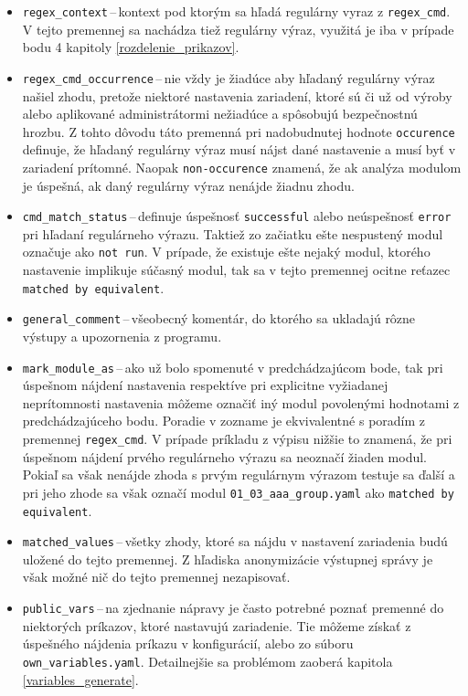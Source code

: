 \begin{itemize}
	\item \texttt{regex\_context}\,--\,kontext pod ktorým sa hľadá regulárny vyraz z \texttt{regex\_cmd}. V tejto premennej sa nachádza tiež regulárny výraz, využitá je iba v prípade bodu 4 kapitoly \ref{rozdelenie_prikazov}.
	\item \texttt{regex\_cmd\_occurrence}\,--\,nie vždy je žiadúce aby hľadaný regulárny výraz našiel zhodu, pretože niektoré nastavenia zariadení, ktoré sú či už od výroby alebo aplikované administrátormi nežiadúce a spôsobujú bezpečnostnú hrozbu. Z tohto dôvodu táto premenná pri nadobudnutej hodnote \texttt{occurence} definuje, že hľadaný regulárny výraz musí nájst dané nastavenie a musí byť v zariadení prítomné. Naopak \texttt{non-occurence} znamená, že ak analýza modulom je úspešná, ak daný regulárny výraz nenájde žiadnu zhodu. 
	\item \texttt{cmd\_match\_status}\,--\,definuje úspešnosť \texttt{successful} alebo neúspešnosť \texttt{error} pri hľadaní regulárneho výrazu. Taktiež zo začiatku ešte nespustený modul označuje ako \texttt{not run}. V prípade, že existuje ešte nejaký modul, ktorého nastavenie implikuje súčasný modul, tak sa v tejto premennej ocitne reťazec \texttt{matched by equivalent}.
	\item \texttt{general\_comment}\,--\,všeobecný komentár, do ktorého sa ukladajú rôzne výstupy a upozornenia z programu.
	\item \texttt{mark\_module\_as}\,--\,ako už bolo spomenuté v predchádzajúcom bode, tak pri úspešnom nájdení nastavenia respektíve pri explicitne vyžiadanej neprítomnosti nastavenia môžeme označiť iný modul povolenými hodnotami z predchádzajúceho bodu. Poradie v zozname je ekvivalentné  s poradím z premennej \texttt{regex\_cmd}. V prípade príkladu z výpisu nižšie to znamená, že pri úspešnom nájdení prvého regulárneho výrazu sa neoznačí žiaden modul. Pokiaľ sa však nenájde zhoda s prvým regulárnym výrazom testuje sa ďalší a pri jeho zhode sa však označí modul \texttt{01\_03\_aaa\_group.yaml} ako \texttt{matched by equivalent}.
	\item \texttt{matched\_values}\,--\,všetky zhody, ktoré sa nájdu v nastavení zariadenia budú uložené do tejto premennej. Z hľadiska anonymizácie výstupnej správy je však možné nič do tejto premennej nezapisovať.
	\item \texttt{public\_vars}\,--\,na zjednanie nápravy je často potrebné poznať premenné do niektorých príkazov, ktoré nastavujú zariadenie. Tie môžeme získať z úspešného nájdenia príkazu v konfigurácií, alebo zo súboru \texttt{own\_variables.yaml}. Detailnejšie sa problémom zaoberá kapitola \ref{variables_generate}.

\end{itemize}
